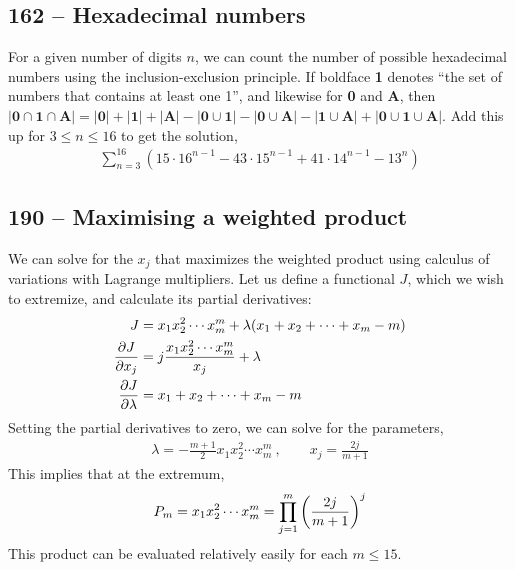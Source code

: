 \documentclass{article}
\begin{document}
\subsection*{162 -- Hexadecimal numbers}
For a given number of digits $n$, we can count the number of possible hexadecimal numbers using the inclusion-exclusion principle.
If boldface \textbf{1} denotes ``the set of numbers that contains at least one 1'', and likewise for \textbf{0} and \textbf{A}, then $|\mathbf{0} \cap \mathbf{1} \cap \mathbf{A}| = |\mathbf{0}| + |\mathbf{1}| + |\mathbf{A}| - |\mathbf{0} \cup \mathbf{1}| - |\mathbf{0} \cup \mathbf{A}| - |\mathbf{1} \cup \mathbf{A}| + |\mathbf{0} \cup \mathbf{1} \cup \mathbf{A}|$.
Add this up for $3 \leq n \leq 16$ to get the solution,
\begin{align*}
	\boxed{ \sum_{n=3}^{16} \left(15 \cdot 16^{n-1} - 43 \cdot 15^{n-1} + 41 \cdot 14^{n-1} - 13^n\right) }
\end{align*}


\subsection*{190 -- Maximising a weighted product}
We can solve for the $x_j$ that maximizes the weighted product using calculus of variations with Lagrange multipliers.
Let us define a functional $J$, which we wish to extremize, and calculate its partial derivatives:
\begin{align*}
	J &= x_1 x_2^2 \cdots x_m^m + \lambda(x_1 + x_2 + \cdots + x_m - m) \\
	\pdv{J}{x_j} &= j \frac{x_1 x_2^2 \cdots x_m^m}{x_j} + \lambda \\
	\pdv{J}{\lambda} &= 	x_1 + x_2 + \cdots + x_m - m
\end{align*}
Setting the partial derivatives to zero, we can solve for the parameters,
\begin{align*}
	\lambda = -\frac{m+1}{2} x_1 x_2^2 \cdots x_m^m ~, \qquad x_j = \frac{2j}{m+1}
\end{align*}
This implies that at the extremum,
\begin{align*}
	P_m = x_1 x_2^2 \cdots x_m^m = \prod_{j=1}^m \qty( \frac{2j}{m+1} )^j
\end{align*}
This product can be evaluated relatively easily for each $m \leq 15$.
\end{document}

